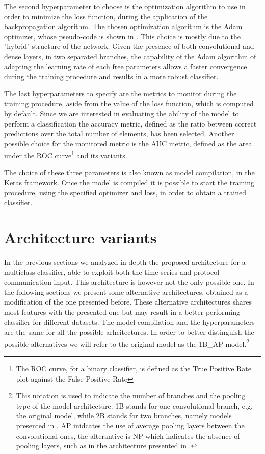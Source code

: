 The second hyperparameter to choose is the optimization algorithm to use in order to minimize the loss function, during the application of the backpropagation algorithm. 
The chosen optimization algorithm is the Adam optimizer, whose pseudo-code is shown in .
This choice is mostly due to the "hybrid" structure of the network. Given the presence of both convolutional and dense layers, in two separated branches, the capability of the Adam algorithm of adapting the learning rate of each free parameters allows a faster convergence during the training procedure and results in a more robust classifier.

The last hyperparameters to specify are the metrics to monitor during the training procedure, aside from the value of the loss function, which is computed by default. Since we are interested in evaluating the ability of the model to perform a classification the accuracy metric, defined as the ratio between correct predictions over the total number of elements, has been selected. Another possible choice for the monitored metric is the AUC metric\cite{auc}, defined as the area under the ROC curve\footnote{The ROC curve, for a binary classifier, is defined as the True Positive Rate plot against the False Positive Rate} and its variants\cite{auc_var}.

The choice of these three parameters is also known as model compilation, in the Keras framework. Once the model is compiled it is possible to start the training procedure, using the specified optimizer and loss, in order to obtain a trained classifier.

\section{Architecture variants} \label{modelalt}

In the previous sections we analyzed in depth the proposed architecture for a multiclass classifier, able to exploit both the time series and protocol communication input. This architecture is however not the only possible one. In the following sections we present some alternative architectures, obtained as a modification of the one presented before. These alternative architectures shares most features with the presented one but may result in a better performing classifier for different datasets. The model compilation and the hyperparameters are the same for all the possible arhcitectures. 
In order to better distinguish the possible alternatives we will refer to the original model as the 1B\_AP model.\footnote{This notation is used to indicate the number of branches and the pooling type of the model architecture. 1B stands for one convolutional branch, e.g. the original model, while 2B stands for two branches, namely models presented in . AP inidcates the use of average pooling layers between the convolutional ones, the alterantive is NP which indicates the absence of pooling layers, such as in the architecture presented in .  }

